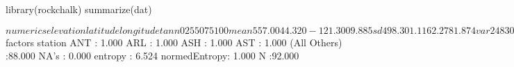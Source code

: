 \begin{Schunk}
\begin{Sinput}
 library(rockchalk)
 summarize(dat)
\end{Sinput}
\begin{Soutput}
$numerics
     elevation latitude longitude   tann
0%        2.00   42.050  -124.600  3.200
25%      94.25   43.600  -123.200  8.700
50%     462.00   44.460  -121.700 10.400
75%     863.80   45.280  -119.600 11.200
100%   1974.00   46.150  -117.000 12.600
mean    557.00   44.320  -121.300  9.885
sd      498.30    1.116     2.278  1.874
var  248300.00    1.245     5.191  3.511
NA's      0.00    0.000     0.000  0.000
N        92.00   92.000    92.000 92.000

$factors
          station      
 ANT          : 1.000  
 ARL          : 1.000  
 ASH          : 1.000  
 AST          : 1.000  
 (All Others) :88.000  
 NA's         : 0.000  
 entropy      : 6.524  
 normedEntropy: 1.000  
 N            :92.000  
\end{Soutput}
\end{Schunk}
